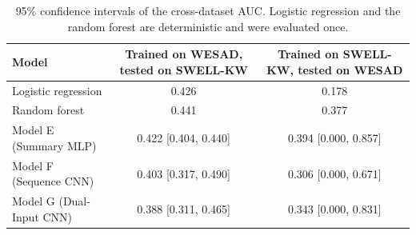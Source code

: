 \begin{table}[h!]
\centering
{}
\caption{95\% confidence intervals on SWELL-KW alone under GroupKFold, five folds over 22 subjects.}
\label{tab:ci_swell_group}
\end{table}

\begin{table}[h!]
\centering
\footnotesize
\begin{tabular}{|l|c|c|}
\hline
\textbf{Model} & \textbf{Trained on WESAD, tested on SWELL-KW} & \textbf{Trained on SWELL-KW, tested on WESAD} \\ \hline
Logistic regression & 0.426 & 0.178 \\ \hline
Random forest & 0.441 & 0.377 \\ \hline
Model E (Summary MLP) & 0.422 [0.404, 0.440] & 0.394 [0.000, 0.857] \\ \hline
Model F (Sequence CNN) & 0.403 [0.317, 0.490] & 0.306 [0.000, 0.671] \\ \hline
Model G (Dual-Input CNN) & 0.388 [0.311, 0.465] & 0.343 [0.000, 0.831] \\ \hline
\end{tabular}
\caption{95\% confidence intervals of the cross-dataset \gls{AUC}. Logistic regression and the random forest are deterministic and were evaluated once.}
\label{tab:ci_transfer}
\end{table}

